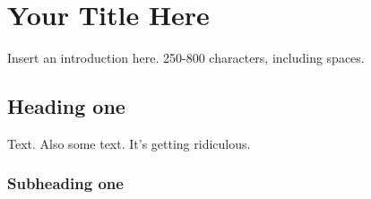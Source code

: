 \documentclass[a4paper,12pt,twoside,openright]{memoir}
\begin{document}



\chapter[How you want it to appear in the ToC][Language Name]{Your Title Here}


\thispagestyle{fancy}
\BgUsetrue


Insert an introduction here. 250-800 characters, including spaces.

\section*{Heading one} %


Text. Also some text. It's getting ridiculous.




\lipsum[2]



\subsection*{Subheading one}

\lipsum[4]

\lipsum[5]
\end{document}
